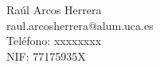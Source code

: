 Raúl Arcos Herrera \\ %
raul.arcosherrera@alum.uca.es\\ %
Teléfono: xxxxxxxx \\ %
NIF: 77175935X \\ %
